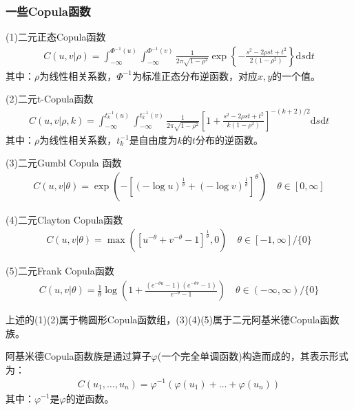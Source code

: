         \subsubsection{一些Copula函数}
            \par
            (1)二元正态Copula函数
            \begin{align*}
            C(u,v|\rho) = \int_{-\infty}^{\varPhi^{-1}(u)} \int_{-\infty}^{\varPhi^{-1}(v)} \frac{1}{2\pi \sqrt{1-\rho^2}} \exp\left\{ -\frac{s^2-2\rho st+t^2}{2(1-\rho^2)} \right\} \mathrm{d}s\mathrm{d}t
            \end{align*}
            其中：$\rho$为线性相关系数，$\varPhi^{-1}$为标准正态分布逆函数，对应$x,y$的一个值。
            \par
            (2)二元t-Copula函数
            \begin{align*}
            C(u,v|\rho,k) = \int_{-\infty}^{t_k^{-1}(u)} \int_{-\infty}^{t_k^{-1}(v)} \frac{1}{2\pi \sqrt{1-\rho^2}}\left[ 1+\frac{s^2-2\rho st +t^2}{k(1-\rho^2)} \right]^{-(k+2)/2} \mathrm{d}s\mathrm{d}t
            \end{align*}
            其中：$\rho$为线性相关系数，$t_k^{-1}$是自由度为$k$的$t$分布的逆函数。
            \par
            (3)二元Gumbl Copula 函数
            \begin{align*}
            C(u,v|\theta) = \exp \left( -\left[ (-\log u)^{\frac{1}{\theta}}+ (-\log v)^{\frac{1}{\theta}}  \right]^\theta \right)  \quad \theta \in [0,\infty]
            \end{align*}
            \par
            (4)二元Clayton Copula函数
            \begin{align*}
            C(u,v|\theta) = \max  \left( [u^{-\theta} + v^{-\theta} - 1]^{\frac{1}{\theta}},0 \right) \quad \theta \in [-1,\infty]/\{0\}
            \end{align*}
            \par
            (5)二元Frank Copula函数
            \begin{align*}
            C(u,v|\theta) = \frac{1}{\theta} \log \left( 1+\frac{(e^{-\theta u}-1)(e^{-\theta v}-1)}{e^{-\theta} -1} \right)  \quad \theta \in (-\infty ,\infty )/\{0\}
            \end{align*}
            \par
            上述的(1)(2)属于椭圆形Copula函数组，(3)(4)(5)属于二元阿基米德Copula函数族。
            \begin{definition}[阿基米德Copula函数族]
            阿基米德Copula函数族是通过算子$\varphi$(一个完全单调函数)构造而成的，其表示形式为：
            \begin{align*}
            C(u_1,\dots,u_n) = \varphi^{-1}(\varphi(u_1)+\dots+\varphi(u_n))
            \end{align*}
            其中：$\varphi^{-1}$是$\varphi$的逆函数。
            \end{definition}
